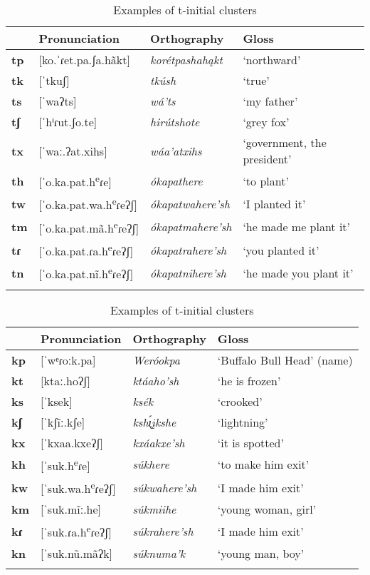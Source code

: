 \begin{table}
\caption{Examples of t-initial clusters}\label{CCexamplest}
\begin{tabularx}{\textwidth}{llQl}
\lsptoprule
\textbf{~}&\textbf{Pronunciation}&\textbf{Orthography}&\textbf{Gloss}\\
\midrule
\textbf{tp}&[ko.ˈɾet.pa.ʃa.hãkt]&\textit{korétpashahąkt}&`northward'\\
\textbf{tk}&[ˈtkuʃ]&\textit{tkúsh}&`true'\\
\textbf{ts}&[ˈwaʔts]&\textit{wá'ts}&`my father'\\
\textbf{tʃ}&[ˈhⁱɾut.ʃo.te]&\textit{hirútshote}&`grey fox'\\
\textbf{tx}&[ˈwaː.ʔat.xihs]&\textit{wáa'atxihs}&`government, the president'\\
\textbf{th}&[ˈo.ka.pat.h\textsuperscript{e}ɾe]&\textit{ókapathere}&`to plant'\\
\textbf{tw}&[ˈo.ka.pat.wa.h\textsuperscript{e}ɾeʔʃ]&\textit{ókapatwahere'sh}& `I planted it'\\
\textbf{tm}&[ˈo.ka.pat.mã.h\textsuperscript{e}ɾeʔʃ]&\textit{ókapatmahere'sh}& `he made me plant it'\\
\textbf{tɾ}&[ˈo.ka.pat.ɾa.h\textsuperscript{e}ɾeʔʃ]&\textit{ókapatrahere'sh}& `you planted it'\\
\textbf{tn}&[ˈo.ka.pat.nĩ.h\textsuperscript{e}ɾeʔʃ]&\textit{ókapatnihere'sh}& `he made you plant it'\\
\lspbottomrule
\end{tabularx}
\end{table}

\begin{table}
\caption{Examples of t-initial clusters}\label{CCexamplesk}
\begin{tabularx}{\textwidth}{lQQl}
\lsptoprule
\textbf{~}&\textbf{Pronunciation}&\textbf{Orthography}&\textbf{Gloss}\\
\midrule
\textbf{kp}&[ˈwᵉɾoːk.pa]&\textit{Weróokpa}&`Buffalo Bull Head' (name)\\
\textbf{kt}&[ktaː.hoʔʃ] &\textit{ktáaho'sh} &`he is frozen'\\
\textbf{ks}&[ˈksek] &\textit{ksék} &`crooked'\\
\textbf{kʃ}&[ˈkʃĩː.kʃe] &\textit{kshı̨́įkshe} &`lightning'\\
\textbf{kx}&[ˈkxaa.kxeʔʃ] &\textit{kxáakxe'sh} &`it is spotted'\\
\textbf{kh}&[ˈsuk.h\textsuperscript{e}ɾe]&\textit{súkhere} &`to make him exit'\\
\textbf{kw}&[ˈsuk.wa.h\textsuperscript{e}ɾeʔʃ] &\textit{súkwahere'sh} &`I made him exit'\\
\textbf{km}&[ˈsuk.mĩː.he] &\textit{súkmiihe} &`young woman, girl'\\
\textbf{kɾ}&[ˈsuk.ɾa.h\textsuperscript{e}ɾeʔʃ]&\textit{súkrahere'sh} &`I made him exit'\\
\textbf{kn}&[ˈsuk.nũ.mãʔk] &\textit{súknuma'k} &`young man, boy'\\
\lspbottomrule
\end{tabularx}
\end{table}


